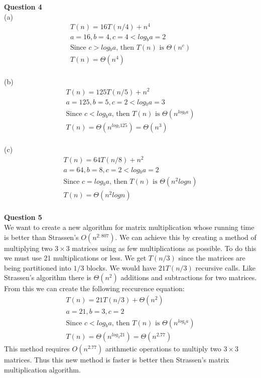 \documentclass{article}
\begin{document}
\pagebreak

{\bf Question 4}\\

(a)\\
\begin{gather*}
        T(n)=16T(n/4)+n^4\\
        a=16, b=4, c=4 < log{_b}a=2\\
        \text {Since } c > log{_b}a \text{, then } T(n) \text{ is } \Theta(n^c)\\
        T(n)=\Theta(n^4)\\
\end{gather*}

(b)\\
\begin{gather*}
        T(n)=125T(n/5)+n^2\\
        a=125, b=5, c=2 < log{_b}a=3\\
        \text {Since } c < log{_b}a \text{, then } T(n) \text{ is } \Theta(n^{log{_b}a})\\
        T(n)=\Theta(n^{log{_5}125})=\Theta(n^3)\\
\end{gather*}

(c)\\
\begin{gather*}
        T(n)=64T(n/8)+n^2\\
        a=64, b=8, c=2 < log{_b}a=2\\
        \text {Since } c = log{_b}a \text{, then } T(n) \text{ is } \Theta(n^2logn)\\
        T(n)=\Theta(n^2log{n})\\
\end{gather*}

{\bf Question 5}\\
We want to create a new algorithm for matrix multiplication whose running time is better than Strassen's $O(n^{2:807})$. We can achieve this by creating a method of multiplying two $3 \times 3$ matrices using as few multiplications as possible. To do this we must use 21 multiplications or less. We get $T(n/3)$ since the matrices are being partitioned into $1/3$ blocks. We would have $21T(n/3)$ recursive calls. Like Strassen's algorithm there is $\Theta(n^2)$ additions and subtractions for two matrices. From this we can create the following reccurence equation:
\begin{gather*}
        T(n)=21T(n/3)+\Theta(n^2)\\
        a=21, b=3, c=2\\
        \text {Since } c < log{_b}a \text{, then } T(n) \text{ is } \Theta(n^{log_{b}a})\\
        T(n)=\Theta(n^{log_{3}21})=\Theta(n^{2.77})
\end{gather*}
This method requires $O(n^{2.77})$ arithmetic operations to multiply two $3\times3$ matrices. Thus this new method is faster is better then Strassen's matrix multiplication algorithm.
\end{document}
